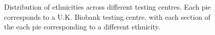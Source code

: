 \begin{figure}
    \caption{Distribution of ethnicities across different testing centres. Each pie corresponds to a U.K. Biobank testing centre, with each section of the each pie corresponding to a different ethnicity.}
    \label{fig:country_of_origin_allInds}
\end{figure}

